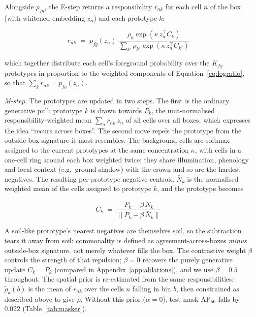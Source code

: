 \documentclass[remotesensing,article,submit,moreauthors]{Definitions/mdpi}
\begin{document}
Alongside $p_{fg}$, the E-step returns a responsibility $r_{nk}$ for each cell $n$ of the box (with whitened embedding $z_n$) and each prototype $k$:

\begin{equation}
r_{nk} \;=\; p_{fg}(z_n)\;
\frac{\rho_k \exp\!\left(\kappa\, z_n^{\top} C_k\right)}
     {\sum_{k'} \rho_{k'} \exp\!\left(\kappa\, z_n^{\top} C_{k'}\right)}
\label{eq:resp}
\end{equation}

which together distribute each cell's foreground probability over the $K_{fg}$ prototypes in proportion to the weighted components of Equation~\eqref{eq:logratio}, so that $\sum_k r_{nk} = p_{fg}(z_n)$.

\medskip\noindent\emph{M-step.} The prototypes are updated in two steps. The first is the ordinary generative pull: prototype $k$ is drawn towards $P_k$, the unit-normalised responsibility-weighted mean $\sum_n r_{nk}\, z_n$ of all cells over all boxes, which expresses the idea ``recurs across boxes''. The second move repels the prototype from the outside-box signature it most resembles. The background cells are softmax-assigned to the current prototypes at the same concentration $\kappa$, with cells in a one-cell ring around each box weighted twice: they share illumination, phenology and local context (e.g.\ ground shadow) with the crown and so are the hardest negatives. The resulting per-prototype negative centroid $\bar N_k$ is the normalised weighted mean of the cells assigned to prototype $k$, and the prototype becomes

\begin{equation}
C_k \;=\; \frac{P_k - \beta\,\bar N_k}{\lVert P_k - \beta\,\bar N_k \rVert}
\label{eq:contrastive}
\end{equation}

A soil-like prototype's nearest negatives are themselves soil, so the subtraction tears it away from soil: commonality is defined as agreement-across-boxes \emph{minus} outside-box signature, not merely whatever fills the box. The contrastive weight $\beta$ controls the strength of that repulsion; $\beta = 0$ recovers the purely generative update $C_k = P_k$ (compared in Appendix~\ref{app:ablations}), and we use $\beta = 0.5$ throughout. The spatial prior is re-estimated from the same responsibilities: $\tilde\rho_k(b)$ is the mean of $r_{nk}$ over the cells $n$ falling in bin $b$, then constrained as described above to give $\rho$. Without this prior ($\alpha = 0$), test mask AP$_{50}$ falls by $0.022$ (Table~\ref{tab:masker}).
\end{document}
